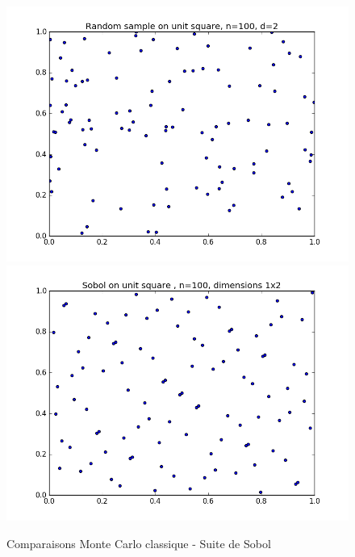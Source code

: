 \documentclass[12pt]{report}
\begin{document}
\begin{figure}[h]
	\centering
	\includegraphics[scale=0.5]{figure_2-halton-random-sample.png}
	\includegraphics[scale=0.5]{figure_4-sobol.png}
	\caption{Comparaisons Monte Carlo classique - Suite de Sobol}	
\end{figure}

\clearpage
\end{document}
